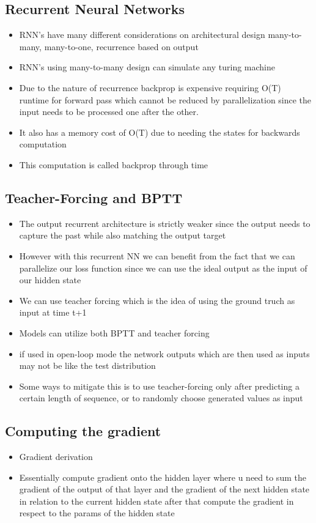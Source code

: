\documentclass[11pt]{article}
\begin{document}
\subsection{Recurrent Neural Networks}
\label{sec:org3eb36db}
\begin{itemize}
\item RNN's have many different considerations on architectural design many-to-many, many-to-one, recurrence based on output
\item RNN's using many-to-many design can simulate any turing machine
\item Due to the nature of recurrence backprop is expensive requiring O(T) runtime for forward pass which cannot be reduced by parallelization since the input needs to be processed one after the other.
\item It also has a memory cost of O(T) due to needing the states for backwards computation
\item This computation is called backprop through time
\end{itemize}
\subsection{Teacher-Forcing and BPTT}
\label{sec:org582b0e3}
\begin{itemize}
\item The output recurrent architecture is strictly weaker since the output needs to capture the past while also matching the output target
\item However with this recurrent NN we can benefit from the fact that we can parallelize our loss function since we can use the ideal output as the input of our hidden state
\item We can use teacher forcing which is the idea of using the ground truch as input at time t+1
\item Models can utilize both BPTT and teacher forcing
\item if used in open-loop mode the network outputs which are then used as inputs may not be like the test distribution
\item Some ways to mitigate this is to use teacher-forcing only after predicting a certain length of sequence, or to randomly choose generated values as input
\end{itemize}
\subsection{Computing the gradient}
\label{sec:org3480743}
\begin{itemize}
\item Gradient derivation
\item Essentially compute gradient onto the hidden layer where u need to sum the gradient of the output of that layer and the gradient of the next hidden state in relation to the current hidden state after that compute the gradient in respect to the params of the hidden state
\end{itemize}
\end{document}
